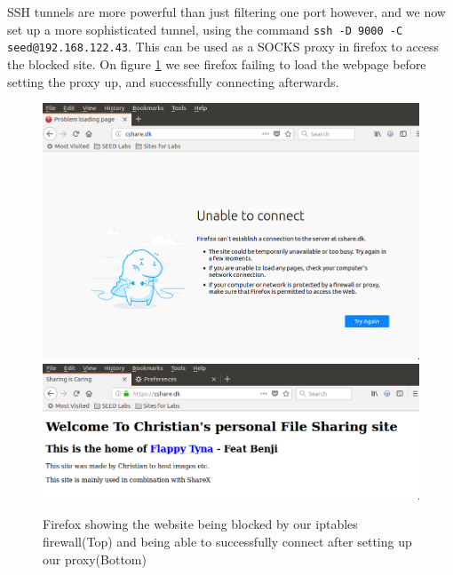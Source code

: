 \documentclass{article}
\begin{document}
SSH tunnels are more powerful than just filtering one port however, and we now set up
a more sophisticated tunnel, using the command \verb!ssh -D 9000 -C seed@192.168.122.43!.
This can be used as a SOCKS proxy in firefox to access the blocked site. On figure
\ref{fig:blockedsite} we see firefox failing to load the webpage before setting the
proxy up, and successfully connecting afterwards.\\
\begin{figure}[!htb]
    \centering
    \includegraphics[width=0.95\linewidth]{capture1.png}
    \includegraphics[width=0.95\linewidth]{capture2.png}
    \caption{Firefox showing the website being blocked by our iptables firewall(Top)
    and being able to successfully connect after setting up our proxy(Bottom)}
    \label{fig:blockedsite}
\end{figure}
\end{document}

